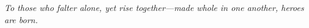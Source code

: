 \cleardoublepage
\begingroup
  \hypersetup{pageanchor=false}%
  \thispagestyle{empty}
  \vspace*{\fill}
  \begin{center}\itshape
  To those who falter alone, yet rise together—made whole in one another, heroes are born.
  \end{center}
  \vspace*{\fill}
  \clearpage
\endgroup